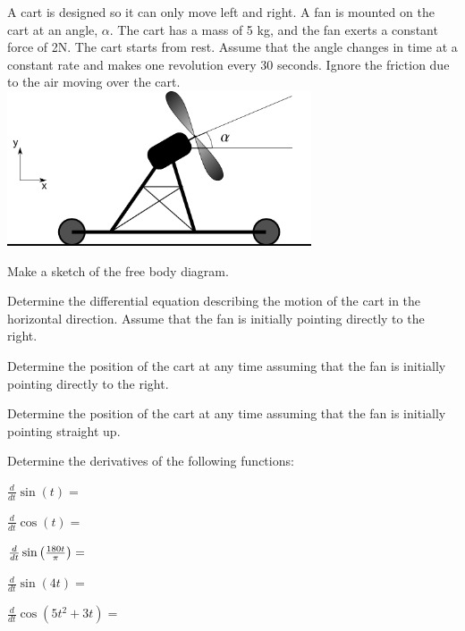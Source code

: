 \begin{problem}
\item A cart is designed so it can only move left and right. A fan is
  mounted on the cart at an angle, $\alpha$. The cart has a mass of 5
  kg, and the fan exerts a constant force of 2N. The cart starts from
  rest. Assume that the angle changes in time at a constant rate and
  makes one revolution every 30 seconds. Ignore the friction due to
  the air moving over the cart. \\
  \includegraphics[width=9cm]{ink/week6/airCart}
  \begin{subproblem}
    \item Make a sketch of the free body diagram.
      \vfill
    \item Determine the differential equation describing the motion of
      the cart in the horizontal direction. Assume that the fan is
      initially pointing directly to the right.
      \vfill
      \clearpage
    \item Determine the position of the cart at any time assuming that
      the fan is initially pointing directly to the right.
      \vfill
    \item Determine the position of the cart at any time assuming that
      the fan is initially pointing straight up.
      \vfill
  \end{subproblem}

  \clearpage

\item Determine the derivatives of the following functions:
  \begin{subproblem}
    \item $\frac{d}{dt} \sin(t) = $
      \vfill
    \item $\frac{d}{dt} \cos(t) = $
      \vfill
    \item $\frac{d}{dt} \sin\left( \frac{180 t}{\pi}  \right) = $
      \vfill
    \item $\frac{d}{dt} \sin(4t) = $
      \vfill
    \item $\frac{d}{dt} \cos(5t^2+3t) = $
      \vfill
  \end{subproblem}


\end{problem}
